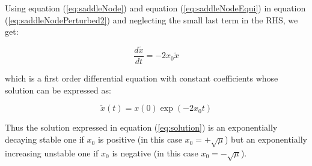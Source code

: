 \documentclass{article}
\begin{document}
	
	Using equation (\ref{eq:saddleNode}) and equation (\ref{eq:saddleNodeEqui}) in equation (\ref{eq:saddleNodePerturbed2}) and neglecting the small last term in the RHS, we get:
	
	\begin{equation}
		\frac{d\tilde x}{dt} = -2x_0\tilde x
	\end{equation}
	
	which is a first order differential equation with constant coefficients whose solution can be expressed as:
	
	\begin{equation}
		\label{eq:solution}
		\tilde{x}(t) = x(0)\exp{(-2x_0t)} 
	\end{equation}
	
	Thus the solution expressed in equation (\ref{eq:solution}) is an exponentially decaying stable one if $x_0$ is positive (in this case $x_0 = +\sqrt{\mu}$) but an exponentially increasing unstable one if $x_0$ is negative (in this case $x_0 = -\sqrt{\mu}$).
\end{document}
